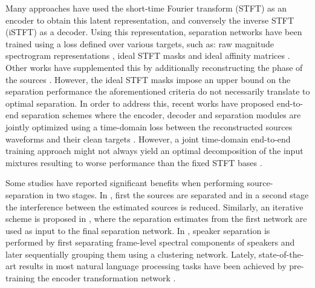 \documentclass{article}
\begin{document}
Many approaches have used the short-time Fourier transform (STFT) as an encoder to obtain this latent representation, and conversely the inverse STFT (iSTFT) as a decoder. Using this representation, separation networks have been trained using a loss defined over various targets, such as: raw magnitude spectrogram representations \cite{huang2014deep}, ideal STFT masks \cite{huang2015jointmasksoptimizationDRNNs, heymann2016neuralspectralmaskestimation} and ideal affinity matrices \cite{hershey2016deepclustering, Isik2016MultiSpeakerDCL}. Other works have supplemented this by additionally reconstructing the phase of the sources \cite{wang2019deepPhaseReconSpeakerSep, wichern2018phaseReconsLearnedTFrepresentations}. However, the ideal STFT masks impose an upper bound on the separation performance the aforementioned criteria do not necessarily translate to optimal separation. In order to address this, recent works have proposed end-to-end separation schemes where the encoder, decoder and separation modules are jointly optimized using a time-domain loss between the reconstructed sources waveforms and their clean targets \cite{luo2019convTasNet, venkataramani2018end, kavalerov2019universal}. However, a joint time-domain end-to-end training approach might not always yield an optimal decomposition of the input mixtures resulting to worse performance than the fixed STFT bases \cite{kavalerov2019universal}.  


Some studies have reported significant benefits when performing source-separation in two stages. In \cite{grais2017twostageInterference}, first the sources are separated and in a second stage the interference between the estimated sources is reduced. Similarly, an iterative scheme is proposed in \cite{kavalerov2019universal}, where the separation estimates from the first network are used as input to the final separation network. In \cite{liu2019DeepCASA}, speaker separation is performed by first separating frame-level spectral components of speakers and later sequentially grouping them using a clustering network. Lately, state-of-the-art results in most natural language processing tasks have been achieved by pre-training the encoder transformation network \cite{devlin2019bert}.
\end{document}
